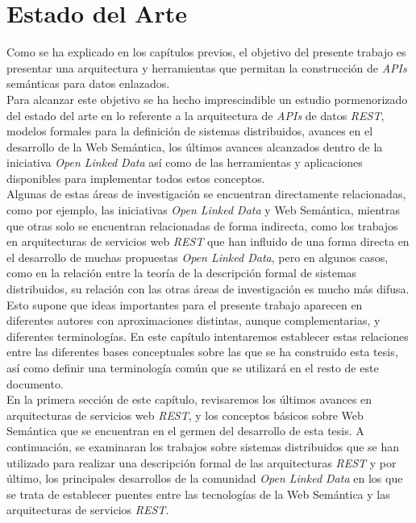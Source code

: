 \chapter{Estado del Arte}

Como se ha explicado en los cap\'itulos previos, el objetivo del presente trabajo es presentar una arquitectura y herramientas que permitan la construcci\'on de \textit{APIs} sem\'anticas para datos enlazados.\\
Para alcanzar este objetivo se ha hecho imprescindible un estudio pormenorizado del estado del arte en lo referente a la arquitectura de \textit{APIs} de datos \textit{REST}, modelos formales para la definici\'on de sistemas distribuidos, avances en el desarrollo de la Web Sem\'antica, los \'ultimos avances alcanzados dentro de la iniciativa \textit{Open Linked Data} as\'i como de las herramientas y aplicaciones disponibles para implementar todos estos conceptos.\\
Algunas de estas \'areas de investigaci\'on se encuentran directamente relacionadas, como por ejemplo, las iniciativas \textit{Open Linked Data} y Web Sem\'antica, mientras que otras solo se encuentran relacionadas de forma indirecta, como los trabajos en arquitecturas de servicios web \textit{REST} que han influido de una forma directa en el desarrollo de muchas propuestas \textit{Open Linked Data}, pero en algunos casos, como en la relaci\'on entre la teor\'ia de la descripci\'on formal de sistemas distribuidos, su relaci\'on con las otras \'areas de investigaci\'on es mucho m\'as difusa. Esto supone que ideas importantes para el presente trabajo aparecen en diferentes autores con aproximaciones distintas, aunque complementarias, y diferentes terminolog\'ias. En este cap\'itulo intentaremos establecer estas relaciones entre las diferentes bases conceptuales sobre las que se ha construido esta tesis, as\'i como definir una terminolog\'ia com\'un que se utilizar\'a en el resto de este documento.\\
En la primera secci\'on de este cap\'itulo, revisaremos los \'ultimos avances en arquitecturas de servicios web \textit{REST}, y los conceptos b\'asicos sobre Web Sem\'antica que se encuentran en el germen del desarrollo de esta tesis. A continuaci\'on, se examinaran los trabajos sobre sistemas distribuidos que se han utilizado para realizar una descripci\'on formal de las arquitecturas \textit{REST} y por \'ultimo, los principales desarrollos de la comunidad \textit{Open Linked Data} en los que se trata de establecer puentes entre las tecnolog\'ias de la Web Sem\'antica y las arquitecturas de servicios \textit{REST}.\\

